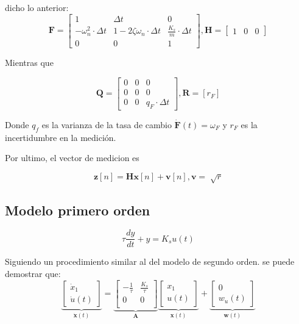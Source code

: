 \documentclass[conference]{IEEEtran}
\begin{document}
dicho lo anterior:
\[
\mathbf{F} = 
\begin{bmatrix}
	1           & \Delta t            & 0 \\
	-\omega_n^2 \cdot \Delta t   & 1 -2\zeta\omega_n \cdot \Delta t   &  \frac{K_s}{m} \cdot \Delta t  \\
	0			& 0				   & 1
\end{bmatrix}, 
\mathbf{H} = 
\begin{bmatrix}
	1 & 0 & 0
\end{bmatrix}
\]


Mientras que 


\[
\mathbf{Q} =  \begin{bmatrix}
	0   & 0    & 0 \\
	0   & 0    & 0  \\
	0   & 0	   & q_F \cdot \Delta t
\end{bmatrix}, \mathbf{R} = [r_F]
\]

Donde $q_f$ es la varianza de la tasa de cambio $\mathbf{\dot{F}}(t) = \omega_{F}$ y $r_F$ es la incertidumbre en la medici\'on.

Por ultimo, el vector de medicion es

\[
\textbf{z}[n] = \textbf{H} \textbf{x}[n] + \textbf{v}[n] ,
\mathbf{v} = \sqrt[]{r}
\]


\subsection{Modelo primero orden}

\[
\tau \frac{dy}{dt} + y = K_s u(t)
\]

Siguiendo un procedimiento similar al del modelo de segundo orden. se puede demostrar que:
\begin{equation*}
	\underbrace{
		\begin{bmatrix}
			\dot{x}_1 \\
			\dot{u}(t)
		\end{bmatrix}
	}_{\mathbf{\dot{x}}(t)}
	=
	\underbrace{\begin{bmatrix}
			-\frac{1}{\tau}           & \frac{K_s}{\tau}                 \\
			0 & 0   \\
	\end{bmatrix}}_{\mathbf{A}}
	\underbrace{\begin{bmatrix}
			x_1 \\
			u(t) 
	\end{bmatrix}}_{\mathbf{x}(t)}	
	+
	\underbrace{
		\begin{bmatrix}
			0 \\
			w_{u}(t)
		\end{bmatrix}
	}_{\mathbf{w}(t)}
\end{equation*}
\end{document}
